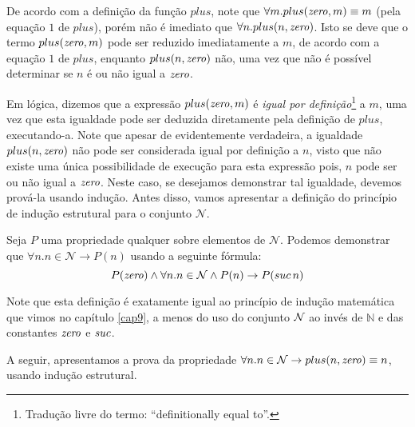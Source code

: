 De acordo com a definição da função $plus$, note que $\forall m. plus(\textit{zero\/},m)
\equiv m$ (pela equação $1$ de $plus$), porém não é imediato que
$\forall n. plus(n,\textit{zero\/})$. Isto se deve que o termo $plus(\textit{zero\/},m)$ pode ser
reduzido imediatamente a $m$, de acordo com a equação $1$ de $plus$,
enquanto $plus(n,\textit{zero\/})$ não, uma vez que não é possível determinar se $n$
é ou não igual a $\textit{zero\/}$.

Em lógica, dizemos que a expressão $plus(\textit{zero\/},m)$ é \textit{igual por
  definição}\footnote{Tradução livre do termo: ``definitionally equal
  to''.} a $m$, uma vez que esta igualdade pode ser deduzida
diretamente pela definição de $plus$, executando-a. Note que apesar de
evidentemente verdadeira, a igualdade $plus(n,\textit{zero\/})$ não pode ser
considerada igual por definição a $n$, visto que não existe uma única
possibilidade de execução para esta expressão pois, $n$ pode ser ou
não igual a $\textit{zero\/}$. Neste caso, se desejamos demonstrar tal igualdade,
devemos prová-la usando indução. Antes disso, vamos apresentar a
definição do princípio de indução estrutural para o conjunto
$\mathcal{N}$.

\begin{Definition}
Seja $P$ uma propriedade qualquer sobre elementos de
$\mathcal{N}$. Podemos demonstrar que $\forall n. n\in\mathcal{N}\to
P(n)$ usando a seguinte fórmula:
\[
P(\textit{zero\/})\land\forall n.n\in\mathcal{N}\land P(n) \to P(suc\,n)
\]
\end{Definition}
Note que esta definição é exatamente igual ao princípio de indução
matemática que vimos no capítulo \ref{cap9}, a menos do uso do
conjunto  $\mathcal{N}$ ao invés de $\mathbb{N}$ e das constantes $\textit{zero\/}$ e
$\textit{suc\/}$.

A seguir, apresentamos a prova da propriedade $\forall n. n\in\mathcal{N}\to
plus(n,\textit{zero\/}) \equiv n$, usando indução estrutural.

